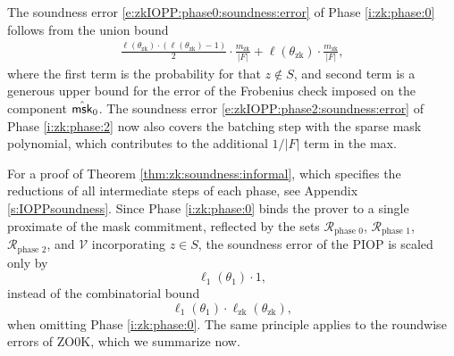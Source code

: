 \begin{rem}
The soundness error \eqref{e:zkIOPP:phase0:soundness:error} of Phase \ref{i:zk:phase:0} follows from the union bound  
\begin{align*}
\frac{\ell(\theta_\text{zk})\cdot (\ell(\theta_\text{zk})-1)}{2} \cdot \frac{m_\text{zk}}{|F|} + \ell(\theta_\text{zk})\cdot \frac{m_\text{zk}}{|F|},    
\end{align*}
where the first term is the probability for that $z\notin S$, and second term is a generous upper bound for the error of the Frobenius check imposed on the component $\hat{\mathsf{msk}}_0$.
The soundness error \eqref{e:zkIOPP:phase2:soundness:error} of Phase \ref{i:zk:phase:2} now also covers the batching step with the sparse mask polynomial, which contributes to the additional $1/|F|$ term in the max.
\end{rem}

For a proof of Theorem \ref{thm:zk:soundness:informal}, which specifies the reductions of all intermediate steps of each phase, see Appendix \ref{s:IOPPsoundness}.
Since Phase \ref{i:zk:phase:0} binds the prover to a single proximate of the mask commitment, reflected by the sets $\mathcal R_\text{phase 0}$, $\mathcal R_\text{phase 1}$, $\mathcal R_\text{phase 2}$, and $\mathcal V$ incorporating $z\in S$, the soundness error of the PIOP is scaled only by
\[
\ell_1(\theta_1) \cdot 1,
\]
instead of the combinatorial bound 
\[
\ell_1(\theta_1)\cdot \ell_\text{zk}(\theta_\text{zk}),
\]
when omitting Phase \ref{i:zk:phase:0}.
The same principle applies to the roundwise errors of ZO0K, which we summarize now.

